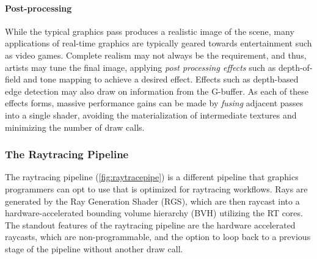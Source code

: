 \documentclass[review, acmsmall, nonacm]{acmart}
\begin{document}
\paragraph{Post-processing} While the typical graphics pass produces a realistic image of the scene, many applications of real-time graphics are typically geared towards entertainment such as video games. Complete realism may not always be the requirement, and thus, artists may tune the final image, applying \emph{post processing effects} such as depth-of-field \cite{mcintoshEfficientlySimulatingBokeh2012} and tone mapping \cite{eilertsenRealtimeNoiseawareTone2015} to achieve a desired effect. Effects such as depth-based edge detection \cite{abidhasanDepthEdgeDetection2016} may also draw on information from the G-buffer. As each of these effects forms, massive performance gains can be made by \emph{fusing} adjacent passes into a single shader, avoiding the materialization of intermediate textures and minimizing the number of draw calls.

\subsubsection{The Raytracing Pipeline}

The raytracing pipeline (\autoref{fig:raytracepipe}) is a different pipeline that graphics programmers can opt to use that is optimized for raytracing workflows. Rays are generated by the Ray Generation Shader (RGS), which are then raycast into a hardware-accelerated bounding volume hierarchy (BVH) utilizing the RT cores. The standout features of the raytracing pipeline are the hardware accelerated raycasts, which are non-programmable, and the option to loop back to a previous stage of the pipeline without another draw call.


\end{document}
